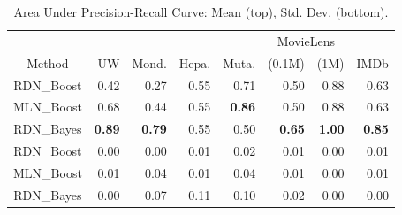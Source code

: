 \documentclass[runningheads,a4paper]{llncs}
\begin{document}
\begin{table}[tb]
  \addtolength{\tabcolsep}{2pt}
  \centering 
  \caption{Area Under Precision-Recall Curve: Mean (top), Std. Dev. (bottom).}
    \begin{tabular}{c r r r r r r r}    \hline
                 &          &            &          &           & \multicolumn{2}{c}{MovieLens} & \\
                                                                          \cline{6-7}     
    Method & UW    & Mond. & Hepa. & Muta. & (0.1M) & (1M)                            & IMDb\\
    \hline
    RDN\_Boost &0.42&0.27&0.55&0.71&0.50&0.88&0.63 \\
    MLN\_Boost &0.68&0.44&0.55& \textbf{0.86} &0.50&0.88&0.63 \\
    RDN\_Bayes & \textbf{0.89} & \textbf{0.79} &0.55&0.50& \textbf{0.65} &\textbf{1.00}& \textbf{0.85} \\
    \hline
    RDN\_Boost &0.00&0.00&0.01&0.02&0.01&0.00&0.01 \\
    MLN\_Boost &0.01&0.04&0.01&0.04&0.01&0.00&0.01 \\
    RDN\_Bayes &0.00&0.07&0.11&0.10&0.02&0.00&0.00 \\
    \hline
    \end{tabular}%
  \label{table:AUC}%
\end{table}%
%
%
\end{document}
